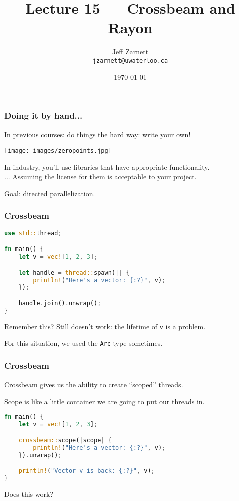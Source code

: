 

\title{Lecture 15 --- Crossbeam and Rayon}

\author{Jeff Zarnett\\ \small \texttt{jzarnett@uwaterloo.ca}}
\date{\today}




\begin{frame}
  \titlepage
 \end{frame}
 
 

\begin{frame}
\frametitle{Doing it by hand...}

In previous courses: do things the hard way: write your own!

\begin{center}
	\texttt{[image: images/zeropoints.jpg]}
\end{center}

In industry, you'll use libraries that have appropriate functionality.\\
\quad ... Assuming the license for them is acceptable to your project.

Goal: directed parallelization. 

\end{frame}


\begin{frame}[fragile]
\frametitle{Crossbeam}

\begin{lstlisting}[language=Rust]
use std::thread;

fn main() {
    let v = vec![1, 2, 3];

    let handle = thread::spawn(|| {
        println!("Here's a vector: {:?}", v);
    });

    handle.join().unwrap();
}
\end{lstlisting}

Remember this? Still doesn't work: the lifetime of \texttt{v} is a problem.

For this situation, we used the \texttt{Arc} type sometimes.
\end{frame}

\begin{frame}[fragile]
\frametitle{Crossbeam}

 Crossbeam gives us the ability to create ``scoped'' threads. 
 
 Scope is like a little container we are going to put our threads in.
 
\begin{lstlisting}[language=Rust]
fn main() {
    let v = vec![1, 2, 3];

    crossbeam::scope(|scope| {
        println!("Here's a vector: {:?}", v);
    }).unwrap();

    println!("Vector v is back: {:?}", v);
}
\end{lstlisting}

Does this work?

\end{frame}


